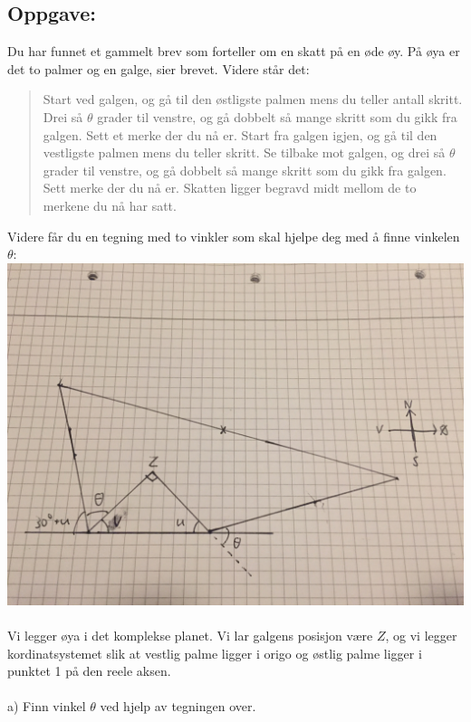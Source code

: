 \documentclass[12pt, a4paper]{article}
\begin{document}
\subsection{Oppgave:}
Du har funnet et gammelt brev som forteller om en skatt på en øde øy. På øya er det to palmer og en galge, sier brevet. Videre står det: \\
\begin{quote}
    Start ved galgen, og gå til den østligste palmen mens du teller antall skritt. 
    Drei så $\theta$ grader til venstre, og gå dobbelt så mange skritt som du gikk fra galgen. 
    Sett et merke der du nå er. 
    Start fra galgen igjen, og gå til den vestligste palmen mens du teller skritt. 
    Se tilbake mot galgen, og drei så $\theta$ grader til venstre, og gå dobbelt så mange skritt som du gikk fra galgen. 
    Sett merke der du nå er. 
    Skatten ligger begravd midt mellom de to merkene du nå har satt.
\end{quote}
Videre får du en tegning med to vinkler som skal hjelpe deg med å finne vinkelen $\theta$: \\

\includegraphics[scale=0.1]{pic_revised}
\\\\
Vi legger øya i det komplekse planet. Vi lar galgens posisjon være $Z$, og vi legger kordinatsystemet slik at 
vestlig palme ligger i origo og østlig palme ligger i punktet 1 på den reele aksen.
\\\\
a) Finn vinkel $\theta$ ved hjelp av tegningen over. \\\\
\end{document}
